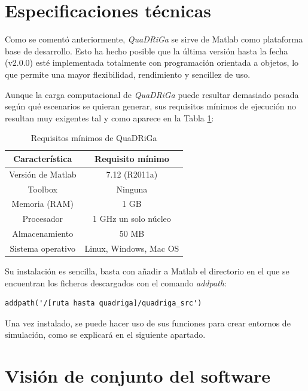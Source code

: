 \section{Especificaciones técnicas}

Como se comentó anteriormente, \textit{QuaDRiGa} se sirve de Matlab como plataforma base de desarrollo. Esto ha hecho posible que la última versión hasta la fecha (v2.0.0) esté implementada totalmente con programación orientada a objetos, lo que permite una mayor flexibilidad, rendimiento y sencillez de uso.

Aunque la carga computacional de \textit{QuaDRiGa} puede resultar demasiado pesada según qué escenarios se quieran generar, sus requisitos mínimos de ejecución no resultan muy exigentes tal y como aparece en la Tabla \ref{tab:espec_quadriga}:

\begin{table}[h!]
\centering
\caption{Requisitos mínimos de QuaDRiGa}
\label{tab:espec_quadriga}
\begin{tabular}{c|c}
\textbf{Característica} & \textbf{Requisito mínimo} \\ \hline
Versión de Matlab       & 7.12 (R2011a)             \\
Toolbox                 & Ninguna                   \\
Memoria (RAM)           & 1 GB                      \\
Procesador              & 1 GHz un solo núcleo      \\
Almacenamiento          & 50 MB                     \\
Sistema operativo       & Linux, Windows, Mac OS   
\end{tabular}
\end{table}

Su instalación es sencilla, basta con añadir a Matlab el directorio en el que se encuentran los ficheros descargados con el comando \textit{addpath}:

\begin{lstlisting}[style=Matlab-editor, basicstyle=\tiny]
addpath('/[ruta hasta quadriga]/quadriga_src')
\end{lstlisting}

Una vez instalado, se puede hacer uso de sus funciones para crear entornos de simulación, como se explicará en el siguiente apartado.

\section{Visión de conjunto del software}

